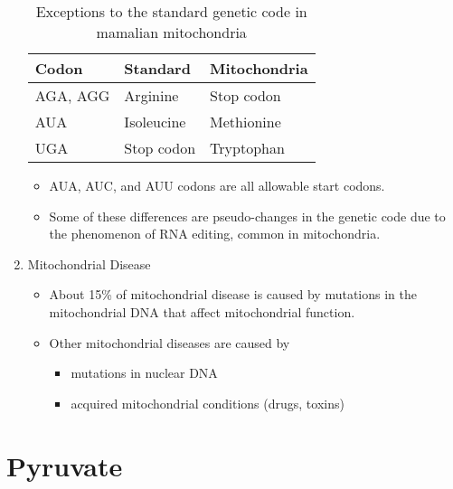 \documentclass{scrartcl}
\begin{document}
\begin{enumerate}
\begin{table}[htbp]
\caption[mito code]{\label{tab:org1d45e88}
Exceptions to the standard genetic code in mamalian mitochondria}
\centering
\begin{tabular}{lll}
Codon & Standard & Mitochondria\\
\hline
AGA, AGG & Arginine & Stop codon\\
AUA & Isoleucine & Methionine\\
UGA & Stop codon & Tryptophan\\
\end{tabular}
\end{table}

\begin{itemize}
\item AUA, AUC, and AUU codons are all allowable start codons.
\item Some of these differences are pseudo-changes in the genetic code due
to the phenomenon of RNA editing, common in mitochondria.
\end{itemize}

\item Mitochondrial Disease
\label{sec:orged7d988}
\begin{itemize}
\item About 15\% of mitochondrial disease is caused by mutations in the
mitochondrial DNA that affect mitochondrial function.
\item Other mitochondrial diseases are caused by
\begin{itemize}
\item mutations in nuclear DNA
\item acquired mitochondrial conditions (drugs, toxins)
\end{itemize}
\end{itemize}
\end{enumerate}
\section{Pyruvate}
\label{sec:orgb642797}
\end{document}
